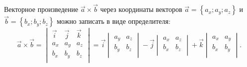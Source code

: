 \documentclass[10pt]{article}
\numberwithin{primer}{section}
\numberwithin{equation}{section}
\begin{document}
Векторное произведение $\vec{a}\times\vec{b}$ через координаты векторов $\vec{a}=\left\{a_x;a_y;a_z\right\}$ и $\vec{b}=\left\{b_x;b_y;b_z\right\}$ можно записать в виде определителя:
\begin{equation}\label{vektproizv}
\vec{a}\times\vec{b}=\begin{vmatrix}
\vec{i} & \vec{j} & \vec{k}\\
a_x & a_y & a_z\\
b_x & b_y & b_z\\
\end{vmatrix}=\vec{i}\begin{vmatrix}
a_y & a_z\\
b_y & b_z\\
\end{vmatrix}-\vec{j}\begin{vmatrix}
a_x & a_z\\
b_x & b_z\\
\end{vmatrix}+\vec{k}\begin{vmatrix}
a_x & a_y\\
b_x & b_y\\
\end{vmatrix}.
\end{equation}
\end{document}
